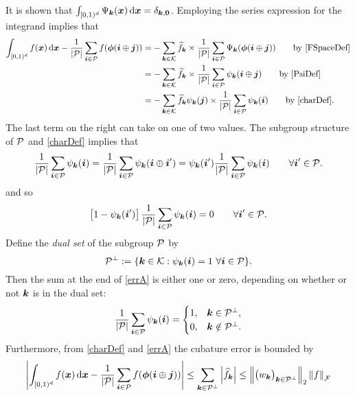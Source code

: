 \documentclass[12pt]{amsart}
\begin{document}
It is shown that $\int_{[0,1)^d} \Psi_{\vk}(\vx) \, \dif \vx = \delta_{\vk,\vzero}$.  Employing the series expression for the integrand implies that 
\begin{align}
\label{errA}
    \int_{[0,1)^d} f(\vx) \, \dif \vx - \frac 1{\abs{\cp}} \sum_{\vi \in \cp} f(\vphi(\vi \oplus \vj)) 
    & = - \sum_{\vk \in \ck} \hf_{\vk} \times \frac 1{\abs{\cp}} \sum_{\vi \in \cp} \Psi_{\vk}(\vphi(\vi \oplus \vj))   \qquad \text{by }\eqref{FSpaceDef} \\
    \nonumber
    & = - \sum_{\vk \in \ck} \hf_{\vk}  \times \frac 1{\abs{\cp}} \sum_{\vi \in \cp} \psi_{\vk}(\vi \oplus \vj) 
    \qquad \text{by }\eqref{PsiDef}\\
    \nonumber 
    & = - \sum_{\vk \in \ck} \hf_{\vk} \psi_{\vk}(\vj) \times  \frac 1{\abs{\cp}} \sum_{\vi \in \cp} \psi_{\vk}(\vi) \qquad \text{by }  \eqref{charDef} .
\end{align}
The last term on the right can take on one of two values.  The subgroup structure of $\cp$ and \eqref{charDef} implies that 
\begin{equation*}
    \frac 1{\abs{\cp}} \sum_{\vi \in \cp} \psi_{\vk}(\vi) 
    = \frac 1{\abs{\cp}} \sum_{\vi \in \cp} \psi_{\vk}(\vi \oplus \vi') 
 = \psi_{\vk}(\vi') \frac 1{\abs{\cp}} \sum_{\vi \in \cp} \psi_{\vk}(\vi) \qquad  \forall \vi' \in \cp.
\end{equation*}
and so
\begin{equation*}
    \left [ 1 - \psi_{\vk}(\vi') \right ] \frac 1{\abs{\cp}} \sum_{\vi \in \cp} \psi_{\vk}(\vi) 
    = 0 \qquad  \forall \vi' \in \cp.
\end{equation*}
Define the \emph{dual set} of the subgroup $\cp$ by 
\begin{equation}
    \cp^{\perp} : = \{\vk \in \ck : \psi_{\vk}(\vi) = 1 \ \forall \vi \in \cp \}.
\end{equation}
Then the sum at the end of \eqref{errA} is either one or zero, depending on whether or not $\vk$ is in the dual set:
\begin{equation}
    \frac 1{\abs{\cp}} \sum_{\vi \in \cp} \psi_{\vk}(\vi) = 
    \begin{cases} 1, & \vk \in \cp^{\perp}, \\
    0, & \vk \notin \cp^{\perp}.
    \end{cases}
\end{equation}
Furthermore,  from  \eqref{charDef} and \eqref{errA} the cubature error is bounded by
\begin{equation}
    \abs{\int_{[0,1)^d} f(\vx) \, \dif \vx - \frac 1{\abs{\cp}} \sum_{\vi \in \cp} f(\vphi(\vi \oplus \vj))}  
    \le \sum_{\vk \in \cp^\perp} \abs{\hf_{\vk}} \le \norm[2]{\bigl(w_{\vk} \bigr)_{\vk \in \cp^\perp} } \norm[\cf]{f}
\end{equation}
\end{document}
